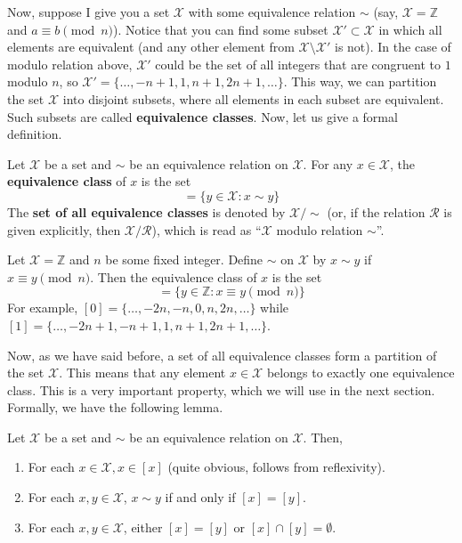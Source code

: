 \documentclass[../lecture-notes.tex]{subfiles}
\begin{document}
Now, suppose I give you a set $\mathcal{X}$ with some equivalence relation $\sim$ (say, $\mathcal{X} = \mathbb{Z}$ and $a \equiv b \pmod{n}$). Notice that you can find some subset $\mathcal{X}' \subset \mathcal{X}$ in which all elements are equivalent (and any other element from $\mathcal{X} \setminus \mathcal{X}'$ is not). In the case of modulo relation above, $\mathcal{X}'$ could be the set of all integers that are congruent to $1$ modulo $n$, so $\mathcal{X}' = \{\dots,-n+1,1,n+1,2n+1,\dots\}$. This way, we can partition the set $\mathcal{X}$ into disjoint subsets, where all elements in each subset are equivalent. Such subsets are called \textbf{equivalence classes}. Now, let us give a formal definition.

\begin{definition}
    Let $\mathcal{X}$ be a set and $\sim$ be an equivalence relation on $\mathcal{X}$. For any $x \in \mathcal{X}$, the \textbf{equivalence class} of $x$ is the set
    \begin{equation*}
        [x] = \{y \in \mathcal{X}: x \sim y\}
    \end{equation*}
    The \textbf{set of all equivalence classes} is denoted by $\mathcal{X}/\text{$\sim$}$ (or, if the relation $\mathcal{R}$ is given explicitly, then $\mathcal{X}/\mathcal{R}$), which is read as ``$\mathcal{X}$ modulo relation $\sim$''.
\end{definition}

\begin{example}
    Let $\mathcal{X} = \mathbb{Z}$ and $n$ be some fixed integer. Define $\sim$ on $\mathcal{X}$ by $x \sim y$ if $x \equiv y \pmod{n}$. Then the equivalence class of $x$ is the set
    \begin{equation*}
        [x] = \{y \in \mathbb{Z}: x \equiv y \pmod{n}\}
    \end{equation*}
    For example, $[0] = \{\ldots,-2n,-n,0,n,2n,\ldots\}$ while $[1] = \{\ldots,-2n+1,-n+1,1,n+1,2n+1,\ldots\}$.
\end{example}

Now, as we have said before, a set of all equivalence classes form a partition of the set $\mathcal{X}$. This means that any element $x \in \mathcal{X}$ belongs to exactly one equivalence class. This is a very important property, which we will use in the next section. Formally, we have the following lemma.
\begin{lemma}
    Let $\mathcal{X}$ be a set and $\sim$ be an equivalence relation on $\mathcal{X}$. Then,
    \begin{enumerate}
        \item For each $x \in \mathcal{X}, x \in [x]$ (quite obvious, follows from reflexivity).
        \item For each $x,y \in \mathcal{X}$, $x \sim y$ if and only if $[x] = [y]$.
        \item For each $x,y \in \mathcal{X}$, either $[x]=[y]$ or $[x] \cap [y] = \emptyset$.
    \end{enumerate}
\end{lemma}
\end{document}
